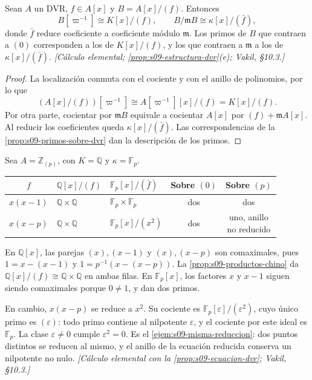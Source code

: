 \begin{prop}
\label{prop:s09-ecuacion-dvr}
Sean $A$ un DVR, $f\in A[x]$ y $B=A[x]/(f)$. Entonces
\[
B[\varpi^{-1}]\cong K[x]/(f),\qquad
B/\mathfrak mB\cong\kappa[x]/(\bar f),
\]
donde $\bar f$ reduce coeficiente a coeficiente módulo $\mathfrak m$. Los primos de $B$ que contraen a $(0)$ corresponden a los de $K[x]/(f)$, y los que contraen a $\mathfrak m$ a los de $\kappa[x]/(\bar f)$. \emph{[Cálculo elemental; \cref{prop:s09-estructura-dvr}(e); Vakil, \S10.3.]}
\end{prop}
\begin{proof}
La localización conmuta con el cociente y con el anillo de polinomios, por lo que
\[
(A[x]/(f))[\varpi^{-1}]
\cong A[\varpi^{-1}][x]/(f)=K[x]/(f).
\]
Por otra parte, cocientar por $\mathfrak mB$ equivale a cocientar $A[x]$ por $(f)+\mathfrak mA[x]$. Al reducir los coeficientes queda $\kappa[x]/(\bar f)$. Las correspondencias de la \cref{prop:s09-primos-sobre-dvr} dan la descripción de los primos.
\end{proof}

\begin{ejem}
\label{ejem:s09-ecuaciones-dos-puntos}
Sea $A=\mathbb Z_{(p)}$, con $K=\mathbb Q$ y $\kappa=\mathbb F_p$.
\begin{center}
\small
\setlength{\tabcolsep}{4pt}
\renewcommand{\arraystretch}{1.25}
\begin{tabular}{cllcc}
\hline
$f$ & $\mathbb Q[x]/(f)$ & $\mathbb F_p[x]/(\bar f)$ & \shortstack{Sobre\\$(0)$} & \shortstack{Sobre\\$(p)$}\\
\hline
$x(x-1)$ & $\mathbb Q\times\mathbb Q$ & $\mathbb F_p\times\mathbb F_p$ & dos & dos\\
$x(x-p)$ & $\mathbb Q\times\mathbb Q$ & $\mathbb F_p[x]/(x^2)$ & dos & \shortstack{uno, anillo\\no reducido}\\
\hline
\end{tabular}
\end{center}
En $\mathbb Q[x]$, las parejas $(x),(x-1)$ y $(x),(x-p)$ son comaximales, pues $1=x-(x-1)$ y $1=p^{-1}(x-(x-p))$. La \cref{prop:s09-productos-chino} da $\mathbb Q[x]/(f)\cong\mathbb Q\times\mathbb Q$ en ambas filas. En $\mathbb F_p[x]$, los factores $x$ y $x-1$ siguen siendo comaximales porque $0\ne1$, y dan dos primos.

En cambio, $x(x-p)$ se reduce a $x^2$. Su cociente es $\mathbb F_p[\varepsilon]/(\varepsilon^2)$, cuyo único primo es $(\varepsilon)$: todo primo contiene al nilpotente $\varepsilon$, y el cociente por este ideal es $\mathbb F_p$. La clase $\varepsilon\ne0$ cumple $\varepsilon^2=0$. Es el \cref{ejem:s09-misma-reduccion}: dos puntos distintos se reducen al mismo, y el anillo de la ecuación reducida conserva un nilpotente no nulo. \emph{[Cálculo elemental con la \cref{prop:s09-ecuacion-dvr}; Vakil, \S10.3.]}
\end{ejem}


